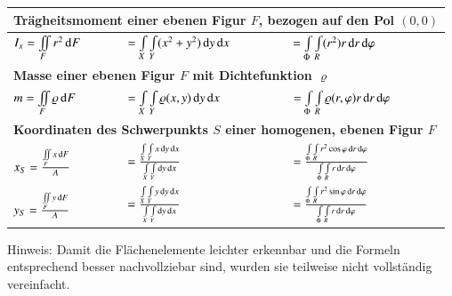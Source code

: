 {\begin{tabular}{|l|l|l|}
        \multicolumn{3}{|l|}{\bf{Trägheitsmoment einer ebenen Figur $F$, bezogen auf den Pol $(0, 0)$}} \\\hline
        $ I_x = \iint\limits_{F} r^2 \mathop{} \! \mathrm{d} F $ & 
        $ = \int\limits_{X}\int\limits_{Y} (x^2 + y^2) \mathop{} \! \mathrm{d} y \mathop{} \! \mathrm{d} x $ &
        $ = \int\limits_{\Phi}\int\limits_{R} (r^2) r \mathop{} \! \mathrm{d} r \mathop{} \! \mathrm{d} \varphi $ \\\hline

        \multicolumn{3}{|l|}{\bf{Masse einer ebenen Figur $F$ mit Dichtefunktion $\varrho$}} \\\hline
        $ m = \iint\limits_{F} \varrho \mathop{} \! \mathrm{d} F $ & 
        $ = \int\limits_{X}\int\limits_{Y} \varrho (x, y) \mathop{} \! \mathrm{d} y \mathop{} \! \mathrm{d} x $ &
        $ = \int\limits_{\Phi}\int\limits_{R} \varrho (r, \varphi) r \mathop{} \! \mathrm{d} r \mathop{} \! \mathrm{d} \varphi $ \\\hline

        \multicolumn{3}{|l|}{\bf{Koordinaten des Schwerpunkts $S$ einer homogenen, ebenen Figur $F$}} \\\hline
        $ x_{S} = \frac{\iint\limits_{F} x \mathop{} \! \mathrm{d} F}{A} $ & 
        $ = \frac{\int\limits_{X}\int\limits_{Y} x \mathop{} \! \mathrm{d} y \mathop{} \! \mathrm{d} x}{\int\limits_{X}\int\limits_{Y} \mathop{} \! \mathrm{d} y \mathop{} \! \mathrm{d} x} $ &
        $ = \frac{\int\limits_{\Phi}\int\limits_{R} r^2 \cos \varphi \mathop{} \! \mathrm{d} r \mathop{} \! \mathrm{d} \varphi}{\int\limits_{\Phi}\int\limits_{R} r \mathop{} \! \mathrm{d} r \mathop{} \! \mathrm{d} \varphi} $ \\
        $ y_{S} = \frac{\iint\limits_{F} y \mathop{} \! \mathrm{d} F}{A} $ & 
        $ = \frac{\int\limits_{X}\int\limits_{Y} y \mathop{} \! \mathrm{d} y \mathop{} \! \mathrm{d} x}{\int\limits_{X}\int\limits_{Y} \mathop{} \! \mathrm{d} y \mathop{} \! \mathrm{d} x} $ &
        $ = \frac{\int\limits_{\Phi}\int\limits_{R} r^2 \sin \varphi \mathop{} \! \mathrm{d} r \mathop{} \! \mathrm{d} \varphi}{\int\limits_{\Phi}\int\limits_{R} r \mathop{} \! \mathrm{d} r \mathop{} \! \mathrm{d} \varphi} $ \\\hline
    \end{tabular}
}

\smallskip
Hinweis: Damit die Flächenelemente leichter erkennbar und die Formeln entsprechend besser nachvollziebar sind, wurden sie teilweise nicht vollständig vereinfacht.


